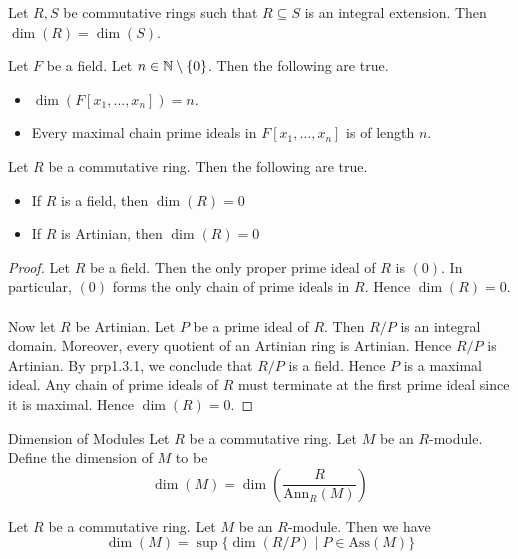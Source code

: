 \documentclass[a4paper]{article}
\begin{document}
\begin{lmm}{}{} Let $R,S$ be commutative rings such that $R\subseteq S$ is an integral extension. Then $\dim(R)=\dim(S)$. 
\end{lmm}

\begin{prp}{}{} Let $F$ be a field. Let $n\in\mathbb{N}\setminus\{0\}$. Then the following are true. 
\begin{itemize}
\item $\dim(F[x_1,\dots,x_n])=n$. 
\item Every maximal chain prime ideals in $F[x_1,\dots,x_n]$ is of length $n$. 
\end{itemize}
\end{prp}

\begin{lmm}{}{} Let $R$ be a commutative ring. Then the following are true. 
\begin{itemize}
\item If $R$ is a field, then $\dim(R)=0$
\item If $R$ is Artinian, then $\dim(R)=0$
\end{itemize} 
\begin{proof}
Let $R$ be a field. Then the only proper prime ideal of $R$ is $(0)$. In particular, $(0)$ forms the only chain of prime ideals in $R$. Hence $\dim(R)=0$. \\~\\

Now let $R$ be Artinian. Let $P$ be a prime ideal of $R$. Then $R/P$ is an integral domain. Moreover, every quotient of an Artinian ring is Artinian. Hence $R/P$ is Artinian. By prp1.3.1, we conclude that $R/P$ is a field. Hence $P$ is a maximal ideal. Any chain of prime ideals of $R$ must terminate at the first prime ideal since it is maximal. Hence $\dim(R)=0$. 
\end{proof}
\end{lmm}

\begin{defn}{Dimension of Modules}{} Let $R$ be a commutative ring. Let $M$ be an $R$-module. Define the dimension of $M$ to be $$\dim(M)=\dim\left(\frac{R}{\text{Ann}_R(M)}\right)$$
\end{defn}

\begin{prp}{}{} Let $R$ be a commutative ring. Let $M$ be an $R$-module. Then we have $$\dim(M)=\sup\{\dim(R/P)\;|\;P\in\text{Ass}(M)\}$$
\end{prp}
\end{document}
